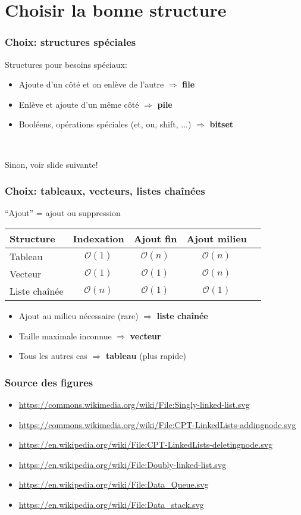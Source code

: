 \documentclass[12pt]{beamer}
\newcommand{\bigoh}[1]{\mathcal{O}\left(#1\right)}
\newcommand{\constant}{\bigoh{1}}
\newcommand{\linear}{\bigoh{n}}
\begin{document}
\section{Choisir la bonne structure}

\begin{frame}
\frametitle{Choix: structures spéciales}
Structures pour besoins spéciaux:
\begin{itemize}
\item Ajoute d'un côté et on enlève de l'autre $\Rightarrow$ \textbf{file}
\item Enlève et ajoute d'un même côté $\Rightarrow$ \textbf{pile}
\item Booléens, opérations spéciales (et, ou, shift, ...) $\Rightarrow$ \textbf{bitset}
\end{itemize}

~

Sinon, voir slide suivante!
\end{frame}

\begin{frame}
\frametitle{Choix: tableaux, vecteurs, listes chaînées}
``Ajout'' = ajout ou suppression
\begin{center}
\begin{tabu}{l|cccc}
\toprule
Structure & Indexation & Ajout fin & Ajout milieu \\
\midrule
Tableau & $\constant$ & $\linear$ & $\linear$ \\
Vecteur & $\constant$ & $\constant$ & $\linear$ \\
Liste chaînée & $\linear$ & $\constant$ & $\constant$ \\
\bottomrule
\end{tabu}
\end{center}
\begin{itemize}
\item Ajout au milieu nécessaire (rare) $\Rightarrow$ \textbf{liste chaînée}
\item Taille maximale inconnue $\Rightarrow$ \textbf{vecteur}
\item Tous les autres cas $\Rightarrow$ \textbf{tableau} (plus rapide)
\end{itemize}
\end{frame}

\begin{frame}
\frametitle{Source des figures}
\begin{itemize}
\item \url{https://commons.wikimedia.org/wiki/File:Singly-linked-list.svg}
\item \url{https://commons.wikimedia.org/wiki/File:CPT-LinkedLists-addingnode.svg}
\item \url{https://en.wikipedia.org/wiki/File:CPT-LinkedLists-deletingnode.svg}
\item \url{https://en.wikipedia.org/wiki/File:Doubly-linked-list.svg}
\item \url{https://en.wikipedia.org/wiki/File:Data_Queue.svg}
\item \url{https://en.wikipedia.org/wiki/File:Data_stack.svg}
\end{itemize}
\end{frame}
\end{document}
